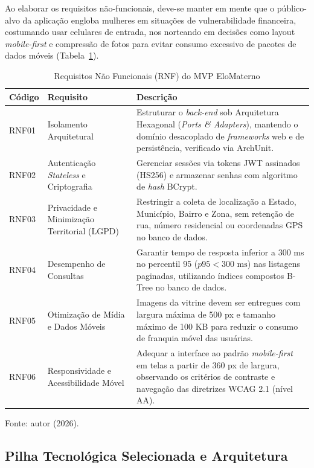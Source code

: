 Ao elaborar os requisitos não-funcionais, deve-se manter em mente que o público-alvo da aplicação engloba mulheres em situações de vulnerabilidade financeira, costumando usar celulares de entrada, nos norteando em decisões como layout \textit{mobile-first} e compressão de fotos para evitar consumo excessivo de pacotes de dados móveis (Tabela~\ref{tab:rnf}).

\begin{table}[H]
\centering
\singlespacing
\caption{Requisitos Não Funcionais (RNF) do MVP EloMaterno}
\label{tab:rnf}
\small
\begin{tabular}{p{1.2cm}p{4.3cm}p{9.2cm}}
\toprule
\textbf{Código} & \textbf{Requisito} & \textbf{Descrição} \\
\midrule
RNF01 & Isolamento Arquitetural & Estruturar o \textit{back-end} sob Arquitetura Hexagonal (\textit{Ports \& Adapters}), mantendo o domínio desacoplado de \textit{frameworks} web e de persistência, verificado via ArchUnit. \\
\addlinespace
RNF02 & Autenticação \textit{Stateless} e Criptografia & Gerenciar sessões via tokens JWT assinados (HS256) e armazenar senhas com algoritmo de \textit{hash} BCrypt. \\
\addlinespace
RNF03 & Privacidade e Minimização Territorial (LGPD) & Restringir a coleta de localização a Estado, Município, Bairro e Zona, sem retenção de rua, número residencial ou coordenadas GPS no banco de dados. \\
\addlinespace
RNF04 & Desempenho de Consultas & Garantir tempo de resposta inferior a 300 ms no percentil 95 ($p95 < 300\text{ ms}$) nas listagens paginadas, utilizando índices compostos B-Tree no banco de dados. \\
\addlinespace
RNF05 & Otimização de Mídia e Dados Móveis & Imagens da vitrine devem ser entregues com largura máxima de 500 px e tamanho máximo de 100 KB para reduzir o consumo de franquia móvel das usuárias. \\
\addlinespace
RNF06 & Responsividade e Acessibilidade Móvel & Adequar a interface ao padrão \textit{mobile-first} em telas a partir de 360 px de largura, observando os critérios de contraste e navegação das diretrizes WCAG 2.1 (nível AA). \\
\bottomrule
\end{tabular}
\vspace{0.15cm}

{\small Fonte: autor (2026).}
\end{table}

\subsection{Pilha Tecnológica Selecionada e Arquitetura}

